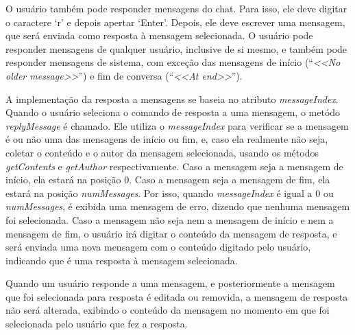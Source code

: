 \documentclass[../main.tex]{subfiles}
\begin{document}
O usuário também pode responder mensagens do chat.
Para isso, ele deve digitar o caractere `r' e depois apertar `Enter'.
Depois, ele deve escrever uma mensagem, que será enviada como resposta à mensagem selecionada.
O usuário pode responder mensagens de qualquer usuário, inclusive de si mesmo, e também pode responder mensagens de sistema, com exceção das mensagens de início (``\textit{<<No older message>>}'') e fim de conversa (``\textit{<<At end>>}'').

A implementação da resposta a mensagens se baseia no atributo \textit{messageIndex}.
Quando o usuário seleciona o comando de resposta a uma mensagem, o metódo \textit{replyMessage} é chamado.
Ele utiliza o \textit{messageIndex} para verificar se a mensagem é ou não uma das mensagens de início ou fim, e, caso ela realmente não seja, coletar o conteúdo e o autor da mensagem selecionada, usando os métodos \textit{getContents} e \textit{getAuthor} respectivamente.
Caso a mensagem seja a mensagem de início, ela estará na posição 0.
Caso a mensagem seja a mensagem de fim, ela estará na posição \textit{numMessages}.
Por isso, quando \textit{messageIndex} é igual a 0 ou \textit{numMessages}, é exibida uma mensagem de erro, dizendo que nenhuma mensagem foi selecionada.
Caso a mensagem não seja nem a mensagem de início e nem a mensagem de fim, o usuário irá digitar o conteúdo da mensagem de resposta, e será enviada uma nova mensagem com o conteúdo digitado pelo usuário, indicando que é uma resposta à mensagem selecionada.

Quando um usuário responde a uma mensagem, e posteriormente a mensagem que foi selecionada para resposta é editada ou removida, a mensagem de resposta não será alterada, exibindo o conteúdo da mensagem no momento em que foi selecionada pelo usuário que fez a resposta.
\end{document}
